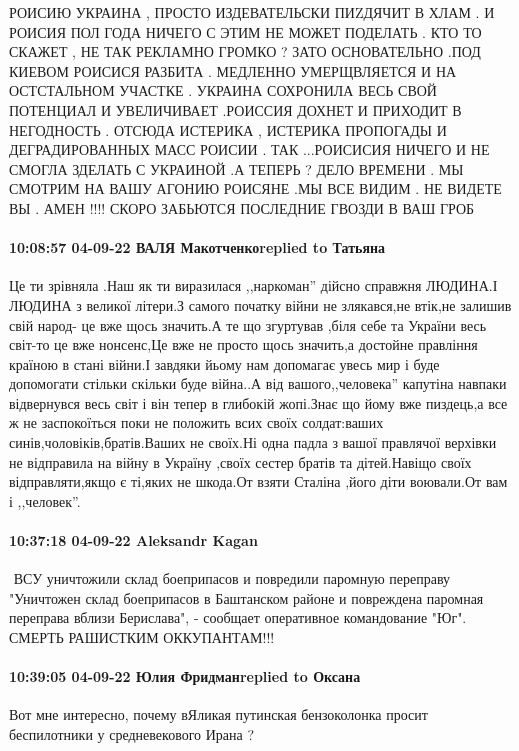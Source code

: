 РОИСИЮ УКРАИНА , ПРОСТО ИЗДЕВАТЕЛЬСКИ ПИZДЯЧИТ В ХЛАМ . И РОИСИЯ ПОЛ ГОДА
НИЧЕГО С ЭТИМ НЕ МОЖЕТ ПОДЕЛАТЬ . КТО ТО СКАЖЕТ , НЕ ТАК РЕКЛАМНО ГРОМКО ? ЗАТО
ОСНОВАТЕЛЬНО .ПОД КИЕВОМ РОИСИСЯ РАЗБИТА . МЕДЛЕННО УМЕРЩВЛЯЕТСЯ И НА
ОСТСТАЛЬНОМ УЧАСТКЕ . УКРАИНА СОХРОНИЛА ВЕСЬ СВОЙ ПОТЕНЦИАЛ И УВЕЛИЧИВАЕТ
.РОИССИЯ ДОХНЕТ И ПРИХОДИТ В НЕГОДНОСТЬ . ОТСЮДА ИСТЕРИКА , ИСТЕРИКА ПРОПОГАДЫ
И ДЕГРАДИРОВАННЫХ МАСС РОИСИИ . ТАК ...РОИСИСИЯ НИЧЕГО И НЕ СМОГЛА ЗДЕЛАТЬ С
УКРАИНОЙ .А ТЕПЕРЬ ? ДЕЛО ВРЕМЕНИ . МЫ СМОТРИМ НА ВАШУ АГОНИЮ РОИСЯНЕ .МЫ ВСЕ
ВИДИМ . НЕ ВИДЕТЕ ВЫ . АМЕН !!!! СКОРО ЗАБЬЮТСЯ ПОСЛЕДНИЕ ГВОЗДИ В ВАШ ГРОБ

\paragraph{10:08:57 04-09-22 ВАЛЯ Макотченкоreplied to Татьяна}

Це ти зрівняла .Наш як ти виразилася ,,наркоман'' дійсно справжня ЛЮДИНА.І
ЛЮДИНА з великої літери.З самого початку війни не злякався,не втік,не залишив
свій народ- це вже щось значить.А те що згуртував ,біля себе та України весь
світ-то це вже нонсенс,Це вже не просто щось значить,а достойне правління
країною в стані війни.І завдяки йьому нам допомагає увесь мир і буде допомогати
стільки скільки буде війна..А від вашого,,человека'' капутіна навпаки
відвернувся весь світ і він тепер в глибокій жопі.Знає що йому вже пиздець,а
все ж не заспокоїться поки не положить всих своїх солдат:ваших
синів,чоловіків,братів.Ваших не своїх.Ні одна падла з вашої правлячої верхівки
не відправила на війну в Україну ,своїх сестер братів та дітей.Навіщо своїх
відправляти,якщо є ті,яких не шкода.От взяти Сталіна ,його діти воювали.От вам
і ,,человек''.

\paragraph{10:37:18 04-09-22 Aleksandr Kagan}

️ ВСУ уничтожили склад боеприпасов и повредили паромную переправу
"Уничтожен склад боеприпасов в Баштанском районе и повреждена паромная переправа вблизи Берислава", - сообщает оперативное командование "Юг".
СМЕРТЬ РАШИСТКИМ ОККУПАНТАМ!!!

\paragraph{10:39:05 04-09-22 Юлия Фридманreplied to Оксана}

Вот мне интересно, почему вЯликая путинская бензоколонка просит беспилотники у
средневекового Ирана ?🤔

